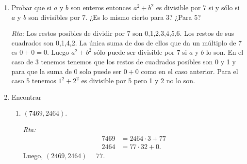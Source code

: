 \documentclass[a4paper,12pt,twoside,spanish,reqno]{amsbook}
\numberwithin{equation}{section}
\newcommand{\rta}{\noindent\textit{Rta: }}
\begin{document}
\begin{enumerate}
\begin{enumerate}
    \textit{Rta Alternativa:} el producto de cuatro enteros consecutivos es de la forma $n(n-1)(n-2)(n-3)$. Ahora bien,
    \begin{equation*}
        \binom{n}{4} = \frac{n!}{(n-4)!4!} = \frac{n(n-1)(n-2)(n-3)}{4!}.
    \end{equation*}
    Por un teorema de la teórica sabemos que $\displaystyle\binom{n}{4}$ es un número entero, por lo tanto $$ \displaystyle\frac{n(n-1)(n-2)(n-3)}{4!}$$ es entero, lo cual quiere decir que $4! | n(n-1)(n-2)(n-3)$ (y $4! = 24$). 

    \item Probar que el producto de $m$  enteros consecutivos es divisible por $m!$.
    
    \rta el producto de $m$ enteros consecutivos es de la forma $n(n-1)(n-2)(n-3)\ldots(n-m+1)$. Ahora bien,
    \begin{equation*}
        \binom{n}{m} = \frac{n!}{(n-m)!m!} = \frac{n(n-1)(n-2)(n-3)\ldots(n-m+1)}{m!}.
    \end{equation*}
    Por un teorema de la teórica sabemos que $\displaystyle\binom{n}{m}$ es un número entero, por lo tanto 
    $$ \frac{n(n-1)(n-2)(n-3)\ldots(n-m+1)}{m!}$$ 
    es entero, lo cual quiere decir que $$m! | n(n-1)(n-2)(n-3)\ldots(n-m+1).$$ 
    
\end{enumerate}




\item Probar que si $a$ y $b$ son enteros entonces $a^2+b^2$ es divisible por 7 si y s\'olo si $a$ y $b$ son divisibles por 7. ¿Es lo mismo cierto para 3? ¿Para 5?

\rta Los restos posibles de dividir por 7 son 0,1,2,3,4,5,6. Los restos de sus cuadrados son 0,1,4,2. La única suma de dos de ellos que da un múltiplo de 7 es $0+0=0$. Luego $a^2+b^2$ sólo puede ser divisible por 7 si $a$ y $b$ lo son.
En el caso de 3 tenemos tenemos que los restos de cuadrados posibles son 0 y 1 y para que la suma de 0 solo puede ser $0+0$ como en el caso anterior. Para el caso 5 tenemos $1^2+2^2$ es divisible por 5 pero 1 y 2 no lo son.




\item Encontrar
\begin{enumerate}

      \item $(7469,2464)$.
      
      \rta 
      \begin{align*}
        7469 &= 2464 \cdot 3 + 77 \\
        2464 &= 77 \cdot 32 +0.
    \end{align*}
    Luego, $(2469,2464)=77$.


\end{enumerate}
\end{enumerate}
\end{document}
